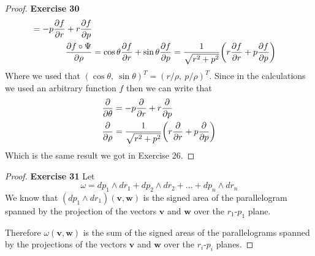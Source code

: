 \documentclass[11pt]{article}
\theoremstyle{definition}
\begin{document}
\begin{proof}{\textbf{Exercise 30}}
\begin{align*}
    = -p\pdv{f}{r} + r\pdv{f}{p}\\
    \pdv{f\circ\Psi}{\rho}
    &= \cos\theta\pdv{f}{r} + \sin\theta\pdv{f}{p}
    = \frac{1}{\sqrt{r^2 + p^2}} \bigg(r\pdv{f}{r} + p\pdv{f}{p}\bigg)
\end{align*}
Where we used that $(\cos\theta,~\sin\theta)^T = (r/\rho,~p/\rho)^T$.
Since in the calculations we used an arbitrary function $f$ then we can write
that
\begin{align*}
    \pdv{}{\theta} &= -p\pdv{}{r} + r\pdv{}{p}\\
    \pdv{}{\rho}
    &= \frac{1}{\sqrt{r^2 + p^2}} \bigg(r\pdv{}{r} + p\pdv{}{p}\bigg)
\end{align*}
Which is the same result we got in Exercise 26.
\end{proof}

\cleardoublepage
\begin{proof}{\textbf{Exercise 31}}
Let
$$\omega = dp_1 \wedge dr_1 + dp_2 \wedge dr_2 + ... + dp_n \wedge dr_n$$
We know that $(dp_1 \wedge dr_1)(\bm{v}, \bm{w})$ is the signed area
of the parallelogram spanned by the projection of the vectors $\bm{v}$ and
$\bm{w}$ over the $r_1$-$p_1$ plane.

Therefore $\omega(\bm{v}, \bm{w})$ is the sum of the signed areas of the
parallelograms spanned by the projections of the vectors $\bm{v}$ and
$\bm{w}$ over the $r_i$-$p_i$ planes.
\end{proof}
\end{document}

